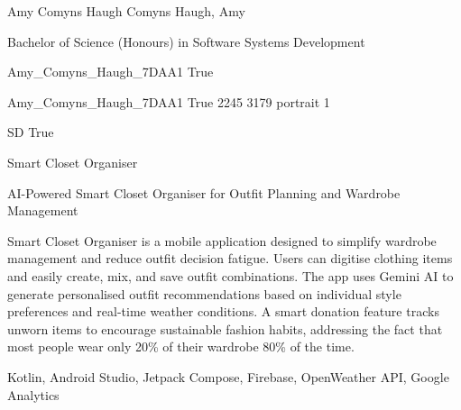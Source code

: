 
\begingroup{}\relax



\def\Key{Amy_Comyns_Haugh_7DAA1}

{Amy Comyns Haugh}
{Comyns Haugh, Amy}

{Bachelor of Science (Honours) in Software Systems Development}

{Amy_Comyns_Haugh_7DAA1}
{True}

{Amy_Comyns_Haugh_7DAA1}
{True}
{2245}
{3179}
{portrait}
{1}

{SD}
{True}

{Smart Closet Organiser}

{AI-Powered Smart Closet Organiser for Outfit Planning and Wardrobe Management}

{Smart Closet Organiser is a mobile application designed to simplify wardrobe management and reduce outfit decision fatigue. Users can digitise clothing items and easily create, mix, and save outfit combinations. The app uses Gemini AI to generate personalised outfit recommendations based on individual style preferences and real-time weather conditions. A smart donation feature tracks unworn items to encourage sustainable fashion habits, addressing the fact that most people wear only 20\% of their wardrobe 80\% of the time.}

{Kotlin, Android Studio, Jetpack Compose, Firebase, OpenWeather API, Google Analytics}

